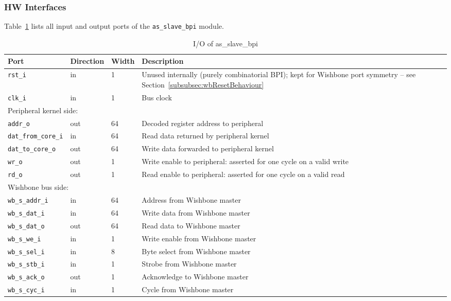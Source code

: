 \subsubsection{HW Interfaces}

Table~\ref{tab:asSlaveBpiIO} lists all input and output ports of the
\texttt{as\_slave\_bpi} module.

\begin{table}[H]
\caption{I/O of as\_slave\_bpi}
\label{tab:asSlaveBpiIO}
\centering
\begin{tabularx}{\textwidth}{|l |l |l |X|}
  \hline
  Port & Direction & Width & Description \\
  \hline
  \hline
  \texttt{rst\_i}            & in  & 1  & Unused internally (purely combinatorial BPI); kept for Wishbone port symmetry -- see Section~\ref{subsubsec:wbResetBehaviour} \\
  \hline
  \texttt{clk\_i}            & in  & 1  & Bus clock \\
  \hline
  \multicolumn{4}{|l|}{Peripheral kernel side:} \\
  \hline
  \texttt{addr\_o}           & out & 64 & Decoded register address to peripheral \\
  \hline
  \texttt{dat\_from\_core\_i}& in  & 64 & Read data returned by peripheral kernel \\
  \hline
  \texttt{dat\_to\_core\_o}  & out & 64 & Write data forwarded to peripheral kernel \\
  \hline
  \texttt{wr\_o}             & out & 1  & Write enable to peripheral: asserted for one cycle on a valid write \\
  \hline
  \texttt{rd\_o}             & out & 1  & Read enable to peripheral: asserted for one cycle on a valid read \\
  \hline
  \multicolumn{4}{|l|}{Wishbone bus side:} \\
  \hline
  \texttt{wb\_s\_addr\_i}    & in  & 64 & Address from Wishbone master \\
  \hline
  \texttt{wb\_s\_dat\_i}     & in  & 64 & Write data from Wishbone master \\
  \hline
  \texttt{wb\_s\_dat\_o}     & out & 64 & Read data to Wishbone master \\
  \hline
  \texttt{wb\_s\_we\_i}      & in  & 1  & Write enable from Wishbone master \\
  \hline
  \texttt{wb\_s\_sel\_i}     & in  & 8  & Byte select from Wishbone master \\
  \hline
  \texttt{wb\_s\_stb\_i}     & in  & 1  & Strobe from Wishbone master \\
  \hline
  \texttt{wb\_s\_ack\_o}     & out & 1  & Acknowledge to Wishbone master \\
  \hline
  \texttt{wb\_s\_cyc\_i}     & in  & 1  & Cycle from Wishbone master \\
  \hline
\end{tabularx}
\end{table}

